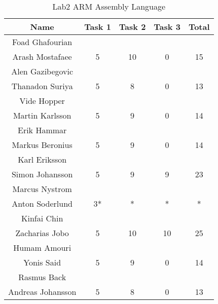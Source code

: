 \documentclass{article}
\begin{document}
\begin{table}[ht]
\caption{Lab2 ARM Assembly Language}
\centering
\begin{tabular}{c c c c c} 
\hline\hline 
Name & Task 1 & Task 2 & Task 3 & Total \\ [0.5ex] 
\hline
Foad Ghafourian \\ Arash Mostafaee 
& 5 & 10 & 0 & 15 \\
\hline
Alen Gazibegovic \\ Thanadon Suriya & 
5 & 8 & 0 & 13 \\
\hline 
Vide Hopper \\ Martin Karlsson
& 5 & 9 & 0 & 14 \\
\hline
Erik Hammar \\ Markus Beronius
& 5 & 9 & 0 & 14 \\
\hline 
Karl Eriksson \\ Simon Johansson
& 5 & 9 & 9 & 23 \\ 
\hline
Marcus Nystrom \\ Anton Soderlund
& 3* & * & * & * \\ 
\hline
Kinfai Chin \\ Zacharias Jobo
& 5 & 10 & 10 & 25 \\
\hline
Humam Amouri \\ Yonis Said
& 5 & 9 & 0 & 14 \\
\hline
Rasmus Back \\ Andreas Johansson
& 5 & 8 & 0 & 13 \\ [1ex]
\hline
\end{tabular}
\label{table:nonlin}
\end{table}
 
\end{document}
